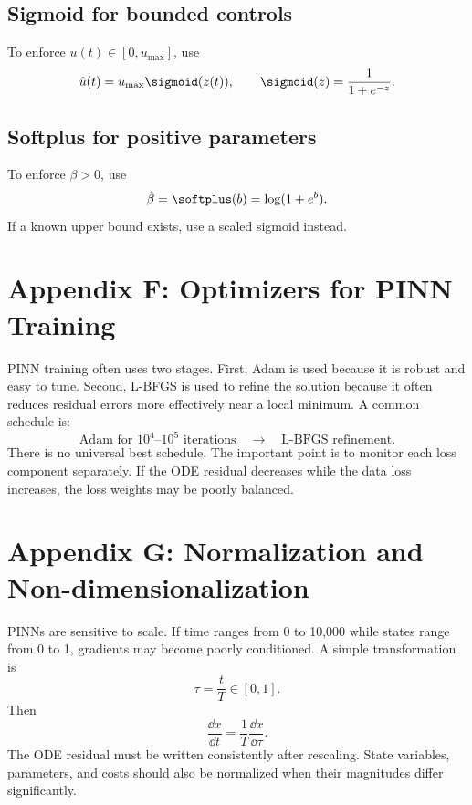 \documentclass[11pt,a4paper]{article}
\begin{document}
\subsection{Sigmoid for bounded controls}
To enforce $u(t)\in[0,u_{\max}]$, use
\begin{equation}
    \hat{u}(t)=u_{\max}\sigmoid(z(t)),\qquad \sigmoid(z)=\frac{1}{1+e^{-z}}.
\end{equation}

\subsection{Softplus for positive parameters}
To enforce $\beta>0$, use
\begin{equation}
    \hat{\beta}=\softplus(b)=\log(1+e^b).
\end{equation}
If a known upper bound exists, use a scaled sigmoid instead.


\section{Appendix F: Optimizers for PINN Training}
PINN training often uses two stages. First, Adam is used because it is robust and easy to tune. Second, L-BFGS is used to refine the solution because it often reduces residual errors more effectively near a local minimum. A common schedule is:
\begin{equation}
    \text{Adam for }10^4\text{--}10^5\text{ iterations} \quad \rightarrow \quad \text{L-BFGS refinement}.
\end{equation}
There is no universal best schedule. The important point is to monitor each loss component separately. If the ODE residual decreases while the data loss increases, the loss weights may be poorly balanced.

\section{Appendix G: Normalization and Non-dimensionalization}
PINNs are sensitive to scale. If time ranges from 0 to 10,000 while states range from 0 to 1, gradients may become poorly conditioned. A simple transformation is
\begin{equation}
    \tau=\frac{t}{T}\in[0,1].
\end{equation}
Then
\begin{equation}
    \frac{\dd x}{\dd t}=\frac{1}{T}\frac{\dd x}{\dd \tau}.
\end{equation}
The ODE residual must be written consistently after rescaling. State variables, parameters, and costs should also be normalized when their magnitudes differ significantly.
\end{document}
